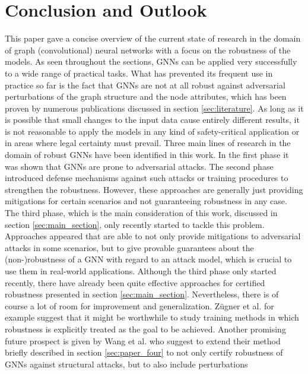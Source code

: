 \documentclass[a4paper,preprint]{sig-alternate}
\begin{document}
\section{Conclusion and Outlook}
\label{sec:conclusion}

This paper gave a concise overview of the current state of research in the domain of graph (convolutional) neural networks with a focus on the robustness 
of the models. As seen throughout the sections, GNNs can be applied very successfully to a wide range of practical tasks.
What has prevented its frequent use in practice so far is the fact that GNNs are not at all robust against adversarial perturbations of the graph structure
and the node attributes, which has been proven by numerous publications discussed in section \ref{sec:literature}.
As long as it is possible that small changes to the input data cause entirely different results, it is not reasonable to
apply the models in any kind of safety-critical application or in areas where legal certainty must prevail.\newline
Three main lines of research in the domain of robust GNNs have been identified in this work. In the first phase it was shown that GNNs are prone to adversarial attacks.
The second phase introduced defense mechanisms against such attacks or training procedures to strengthen the robustness. However, these approaches
are generally just providing mitigations for certain scenarios and not guaranteeing robustness in any case.
The third phase, which is the main consideration of this work, discussed in section \ref{sec:main_section}, only recently started to tackle this problem. 
Approaches appeared that are able to not only provide mitigations to adversarial attacks in some scenarios, but to give provable guarantees about 
the (non-)robustness of a GNN with regard to an attack model, which is crucial to use them in real-world applications.\newline
Although the third phase only started recently, there have already been quite effective approaches for certified robustness presented in section \ref{sec:main_section}.
Nevertheless, there is of course a lot of room for improvement and generalization.
Zügner et al. \cite{10.1145/3394486.3403217} for example suggest that it might be worthwhile to study training methods in which 
robustness is explicitly treated as the goal to be achieved.
Another promising future prospect is given by Wang et al. \cite{Wang_2020} who suggest to extend their method briefly described in 
section \ref{sec:paper_four} to not only certify robustness of GNNs against structural attacks, but to also include perturbations
\end{document}
